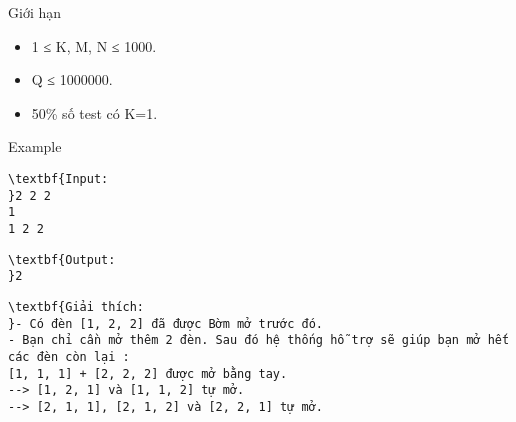 Giới hạn
\begin{itemize}
	\item 1 ≤ K, M, N ≤ 1000.
	\item Q ≤ 1000000.
	\item 50\% số test có K=1.
\end{itemize}
Example
\begin{verbatim}
\textbf{Input:
}2 2 2
1
1 2 2\end{verbatim}
\begin{verbatim}
\textbf{Output:
}2\end{verbatim}
\begin{verbatim}
\textbf{Giải thích:
}- Có đèn [1, 2, 2] đã được Bờm mở trước đó.
- Bạn chỉ cần mở thêm 2 đèn. Sau đó hệ thống hỗ trợ sẽ giúp bạn mở hết các đèn còn lại :
[1, 1, 1] + [2, 2, 2] được mở bằng tay.
--> [1, 2, 1] và [1, 1, 2] tự mở.
--> [2, 1, 1], [2, 1, 2] và [2, 2, 1] tự mở.
\end{verbatim}